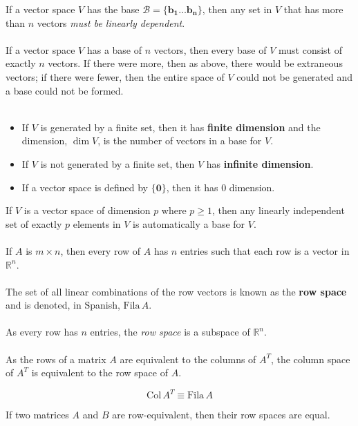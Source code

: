 \documentclass[12pt]{article}
\newcommand{\R}{\mathbb{R}}
\newcommand{\bt}[1]{\textbf{{#1}}}
\newcommand{\bm}[1]{\mathbf{{#1}}}
\newcommand{\mmc}[1]{\mathcal{{#1}}}
\newcommand{\set}[1]{\{{#1}\}}
\begin{document}
If a vector space $V$ has the base $\mmc{B} = \set{\bm{b_1\dots b_n}}$, then any set in $V$ that has more than $n$ vectors \emph{must be linearly dependent}. \\ \\

If a vector space $V$ has a base of $n$ vectors, then every base of $V$ must consist of exactly $n$ vectors. If there were more, then as above, there would be extraneous vectors;
if there were fewer, then the entire space of $V$ could not be generated and a base could not be formed. \\ \\

\begin{itemize}
    \item If $V$ is generated by a finite set, then it has \bt{finite dimension} and the dimension, $\dim V$, is the number of vectors in a base for $V$.
    \item If $V$ is not generated by a finite set, then $V$ has \bt{infinite dimension}.
    \item If a vector space is defined by $\set{\bm{0}}$, then it has $0$ dimension.
\end{itemize}

If $V$ is a vector space of dimension $p$ where $p \geq 1$, then any linearly independent set
of exactly $p$ elements in $V$ is automatically a base for $V$. \\ \\

If $A$ is $m \times n$, then every row of $A$ has $n$ entries such that each row is a vector in $\R^n$. \\ \\

The set of all linear combinations of the row vectors is known as the \bt{row space} and is denoted, in Spanish, $\textrm{Fila}\,A$. \\ \\

As every row has $n$ entries, the \emph{row space} is a subspace of $\R^n$. \\ \\

As the rows of a matrix $A$ are equivalent to the columns of $A^T$, the column space of $A^T$ is equivalent to the row space of $A$.

$$\textrm{Col}\,A^T \equiv \textrm{Fila}\,A$$

If two matrices $A$ and $B$ are row-equivalent, then their row spaces are equal. \\ \\
\end{document}
